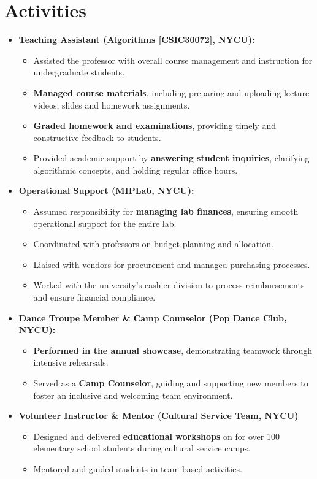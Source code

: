 \documentclass[a4paper,12pt]{article}
\begin{document}
\section{Activities}
\begin{itemize}[nosep,after=\strut, leftmargin=1em, itemsep=3pt]
  \item \textbf{Teaching Assistant (Algorithms [CSIC30072], NYCU):} 
  \begin{itemize}
    \item Assisted the professor with overall course management and instruction for undergraduate students.
    \item \textbf{Managed course materials}, including preparing and uploading lecture videos, slides and homework assignments.
    \item \textbf{Graded homework and examinations}, providing timely and constructive feedback to students.
    \item Provided academic support by \textbf{answering student inquiries}, clarifying algorithmic concepts, and holding regular office hours.
  \end{itemize}

  \item \textbf{Operational Support (MIPLab, NYCU):} 
  \begin{itemize}
    \item Assumed responsibility for \textbf{managing lab finances}, ensuring smooth operational support for the entire lab.

    \item Coordinated with professors on budget planning and allocation.

    \item Liaised with vendors for procurement and managed purchasing processes.

    \item Worked with the university's cashier division to process reimbursements and ensure financial compliance.
  \end{itemize}

  \item \textbf{Dance Troupe Member \& Camp Counselor (Pop Dance Club, NYCU):} 
  \begin{itemize}
    \item \textbf{Performed in the annual showcase}, demonstrating teamwork through intensive rehearsals.

    \item Served as a \textbf{Camp Counselor}, guiding and supporting new members to foster an inclusive and welcoming team environment.
  \end{itemize}

\item \textbf{Volunteer Instructor \& Mentor (Cultural Service Team, NYCU)}
  \begin{itemize}
    \item Designed and delivered \textbf{educational workshops} on  for over 100 elementary school students during cultural service camps.
    \item Mentored and guided students in team-based activities.
  \end{itemize}
\end{itemize}
\end{document}
